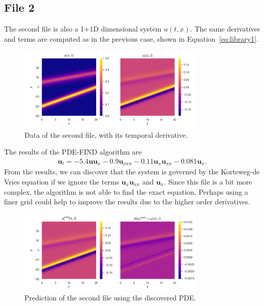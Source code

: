 \documentclass[unicode,11pt,a4paper,oneside,numbers=endperiod,openany]{scrartcl}
\begin{document}
\subsection*{File 2}
The second file is also a 1+1D dimensional system $u(t, x)$. The same
derivatives and terms are computed as in the previous case, shown in Equation~\eqref{eq:library1}.
\begin{figure}[h]
    \centering
    \includegraphics[width=0.8\textwidth]{../Task2/figures/data_2.png}
    \caption{Data of the second file, with its temporal derivative.}
\end{figure}
The results of the PDE-FIND algorithm are
\begin{align}
    \mathbf{u}_t = -5.4 \mathbf{u} \mathbf{u}_x - 0.9 \mathbf{u}_{xxx} - 0.11 \mathbf{u}_x \mathbf{u}_{xx} - 0.081 \mathbf{u}_x.
\end{align}
From the results, we can discover that the system is governed by the
Korteweg-de Vries equation if we ignore the terms $\mathbf{u}_x \mathbf{u}_{xx}$ and
$\mathbf{u}_x$. Since this file is a bit more complex, the algorithm is not able
to find the exact equation. Perhaps using a finer grid could help to improve the
results due to the higher order derivatives.
\begin{figure}[h]
    \centering
    \includegraphics[width=0.8\textwidth]{../Task2/figures/results_2.png}
    \caption{Prediction of the second file using the discovered PDE.}
\end{figure}
\end{document}
